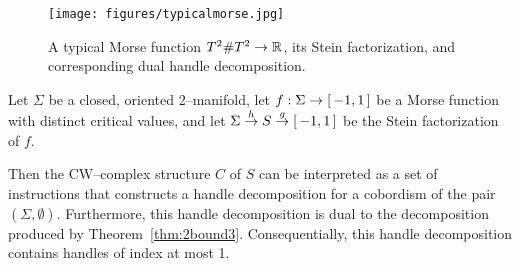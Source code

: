 \begin{figure}
	\caption{A typical Morse function $T^2\# T^2\to\mathbb{R}$, its Stein factorization, and corresponding dual handle decomposition.}
	\centering
	\texttt{[image: figures/typicalmorse.jpg]}
	\label{fig:typicalmorse}
\end{figure}

\begin{theorem}
	\label{thm:2stein3}
	Let $\Sigma$ be a closed, oriented 2--manifold, let $f:\Sigma\to[\,-1,1\,]$ be a Morse function with distinct critical values, and let $\Sigma\overset{h}{\to}S\overset{g}{\to}[\,-1,1\,]$ be the Stein factorization of $f$.
	
	Then the CW--complex structure $C$ of $S$ can be interpreted as a set of instructions that constructs a handle decomposition for a cobordism of the pair $(\Sigma,\emptyset)$.
	Furthermore, this handle decomposition is dual to the decomposition produced by Theorem~\ref{thm:2bound3}.
	Consequentially, this handle decomposition contains handles of index at most 1. 
\end{theorem}

